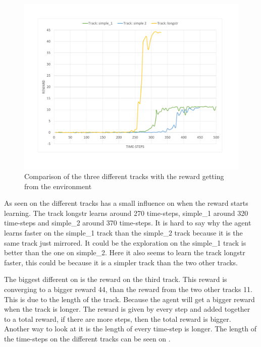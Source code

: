 \begin{figure}[H]
	\centering
	\includegraphics[width=1\textwidth]{Figures/Result/change_of_track_reward_graph.pdf}
	\caption{Comparison of the three different tracks with the reward getting from the environment}
	\label{fig:change_of_track_reward_graph}
\end{figure}

As seen on  the different tracks has a small influence on when the reward starts learning. The track longstr learns around 270 time-steps, simple\_1 around 320 time-steps and simple\_2 around 370 time-steps. It is hard to say why the agent learns faster on the simple\_1 track than the simple\_2 track because it is the same track just mirrored. It could be the exploration on the simple\_1 track is better than the one on simple\_2. Here it also seems to learn the track longstr faster, this could be because it is a simpler track than the two other tracks.  

The biggest different on  is the reward on the third track. This reward is converging to a bigger reward 44, than the reward from the two other tracks 11. This is due to the length of the track. Because the agent will get a bigger reward when the track is longer. The reward is given by every step and added together to a total reward, if there are more steps, then the total reward is bigger. Another way to look at it is the length of every time-step is longer. The length of the time-steps on the different tracks can be seen on .     


